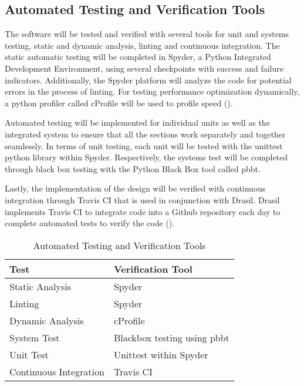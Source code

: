 \documentclass[12pt, titlepage]{article}
\begin{document}
\subsection{Automated Testing and Verification Tools}

The \progname{} software will be tested and verified with several tools for 
unit and systems testing, static and dynamic analysis, linting and continuous 
integration. The static automatic testing will be completed in Spyder, a Python 
Integrated Development Environment, using several checkpoints with success and 
failure indicators. Additionally, the Spyder platform will analyze the code for 
potential errors in the process of linting. For testing performance optimization 
dynamically, a python profiler called cProfile will be used to profile speed 
(\citet{cProfile}).

Automated testing will be implemented for individual units as well as the 
integrated system to ensure that all the sections work separately and together 
seamlessly. In terms of unit  testing, each unit will be tested with the 
unittest python library within Spyder. Respectively, the systems test will be 
completed through black box testing with the Python Black Box tool called pbbt.

Lastly, the implementation of the design will be verified with continuous 
integration through Travis CI that is used in conjunction with Drasil. Drasil 
implements Travis CI to integrate code into a Github repository each day to 
complete automated tests to verify the code (\citet{Drasil}). 

\begin{table}[ht]
\begin{center}
\renewcommand{\arraystretch}{1.2}
\begin{tabular}{l l} 
  \toprule		
  \textbf{Test} & \textbf{Verification Tool}\\
  \midrule 
  Static Analysis & Spyder\\
  Linting & Spyder\\
  Dynamic Analysis & cProfile \\
  System Test & Blackbox testing using pbbt\\
  Unit Test & Unittest within Spyder \\
  Continuous Integration & Travis CI\\
  \bottomrule
\end{tabular}\\
\end{center}
\caption{Automated Testing and Verification Tools}

\end{table}
\end{document}
